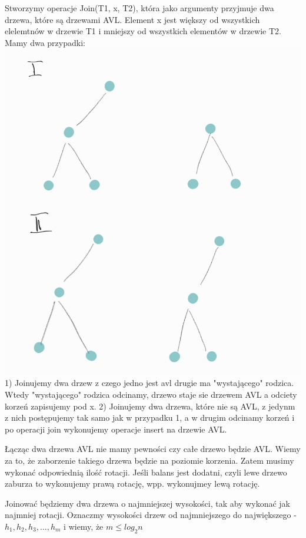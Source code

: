 \documentclass[12pt]{article}
\begin{document}
Stworzymy operacje Join(T1, x, T2), która jako argumenty przyjmuje dwa drzewa, które są drzewami AVL.
Element x jest większy od wszystkich elelemtnów w drzewie T1 i mniejszy od wszystkich elementów w drzewie T2.
Mamy dwa przypadki:
\includegraphics[scale=0.5]{7_3.png}
1) Joinujemy dwa drzew z czego jedno jest avl drugie ma "wystającego" rodzica. Wtedy "wystającego" rodzica odcinamy, drzewo staje sie drzewem AVL a odciety korzeń zapisujemy pod x.
2) Joinujemy dwa drzewa, które nie są AVL, z jedynm z nich postępujemy tak samo jak w przypadku 1, a w drugim odcinamy korzeń i po operacji join wykonujemy operacje insert na drzewie AVL.



Łącząc dwa drzewa AVL nie mamy pewności czy całe drzewo będzie AVL. Wiemy za to, że zaborzenie takiego drzewa będzie na poziomie korzenia. Zatem musimy wykonać odpowiednią ilość rotacji.
Jeśli balans jest dodatni, czyli lewe drzewo zaburza to wykonujemy prawą rotację, wpp. wykonujmey lewą rotację.

Joinować będziemy dwa drzewa o najmniejszej wysokości, tak aby wykonać jak najmniej rotacji. Oznaczmy wysokości drzew od najmniejszego do największego - $h_1, h_2, h_3, ..., h_m$ i wiemy, że $m\leq log_2 n$
\end{document}
